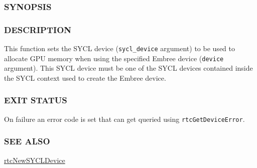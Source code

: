 \begin{Shaded}
\begin{Highlighting}[]
\OperatorTok{{-}}
\end{Highlighting}
\end{Shaded}

\subsubsection{SYNOPSIS}\label{synopsis}

\begin{Shaded}
\begin{Highlighting}[]

\OperatorTok{(}\OperatorTok{,} \OperatorTok{::}\OperatorTok{);}
\end{Highlighting}
\end{Shaded}

\subsubsection{DESCRIPTION}\label{description}

This function sets the SYCL device (\texttt{sycl\_device} argument) to
be used to allocate GPU memory when using the specified Embree device
(\texttt{device} argument). This SYCL device must be one of the SYCL
devices contained inside the SYCL context used to create the Embree
device.

\subsubsection{EXIT STATUS}\label{exit-status}

On failure an error code is set that can get queried using
\texttt{rtcGetDeviceError}.

\subsubsection{SEE ALSO}\label{see-also}

\hyperref[rtcnewsycldevice]{rtcNewSYCLDevice}

\pagebreak

